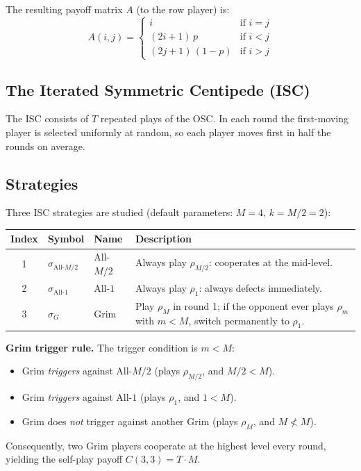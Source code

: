 \documentclass[12pt,a4paper]{article}
\begin{document}
The resulting payoff matrix $A$ (to the row player) is:
\[
  A(i,j) = \begin{cases}
    i                  & \text{if } i = j \\
    (2i+1)\,p          & \text{if } i < j \\
    (2j+1)\,(1-p)      & \text{if } i > j
  \end{cases}
\]

\subsection{The Iterated Symmetric Centipede (ISC)}

The ISC consists of $T$ repeated plays of the OSC. In each round the
first-moving player is selected uniformly at random, so each player moves first
in half the rounds on average.

\subsection{Strategies}

Three ISC strategies are studied (default parameters: $M=4$, $k = M/2 = 2$):

\begin{center}
\begin{tabular}{cllp{7cm}}
\toprule
Index & Symbol & Name & Description \\
\midrule
1 & $\sigma_{\text{All-}M/2}$ & All-$M/2$ &
    Always play $\rho_{M/2}$: cooperates at the mid-level. \\
2 & $\sigma_{\text{All-}1}$   & All-$1$ &
    Always play $\rho_1$: always defects immediately. \\
3 & $\sigma_G$                & Grim &
    Play $\rho_M$ in round 1; if the opponent ever plays $\rho_m$ with
    $m < M$, switch permanently to $\rho_1$. \\
\bottomrule
\end{tabular}
\end{center}

\medskip
\noindent\textbf{Grim trigger rule.} The trigger condition is $m < M$:
\begin{itemize}
  \item Grim \emph{triggers} against All-$M/2$ (plays $\rho_{M/2}$, and $M/2 < M$).
  \item Grim \emph{triggers} against All-$1$ (plays $\rho_1$, and $1 < M$).
  \item Grim does \emph{not} trigger against another Grim (plays $\rho_M$, and $M \not< M$).
\end{itemize}
Consequently, two Grim players cooperate at the highest level every round,
yielding the self-play payoff $C(3,3) = T \cdot M$.
\end{document}
